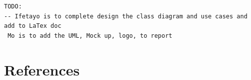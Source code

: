 \documentclass[a4paper,10pt]{article}
\begin{document}
\begin{appendices}
\begin{lstlisting}[frame=single,caption=Meeting of 9/3/15,label=minutes7]
TODO:
-- Ifetayo is to complete design the class diagram and use cases and add to LaTex doc 
 Mo is to add the UML, Mock up, logo, to report

\end{lstlisting}




\clearpage
\pagebreak
\section{References}
{}


\end{appendices}
\end{document}
